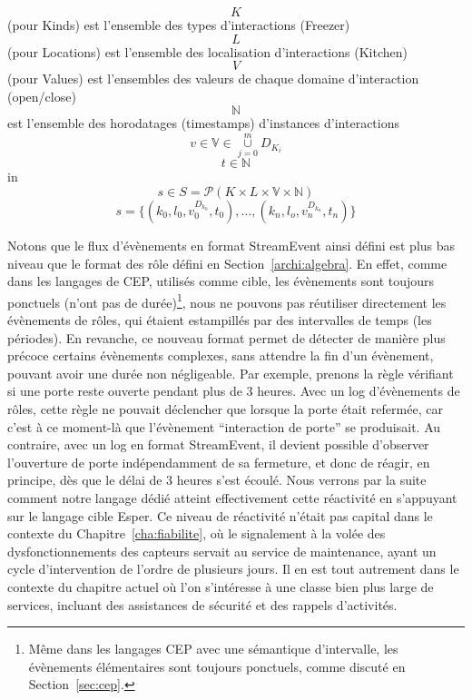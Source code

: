 \[K\] (pour Kinds) est l'ensemble des types d'interactions (\eg Freezer)
\[L\] (pour Locations) est l'ensemble des localisation d'interactions (\eg Kitchen)
\[V\] (pour Values) est l'ensembles des valeurs de chaque domaine d'interaction (\eg open/close)
\[\mathds{N}\] est l'ensemble des horodatages (timestamps) d'instances d'interactions
\[
  v \in \mathds{V} \in \overset{m}{\underset{j=0}\cup}D_{K_i}
\] 
\[ 
t \in \mathds{N}
\]
in
\[
  s \in S=\mathcal{P}(K\times L\times \mathds{V}\times \mathds{N})
\]
\[
  s =\{(k_0,l_0,v^{D_{k_0}}_0,t_0), \dots, (k_n,l_o,v^{D_{k_n}}_n,t_n)\}
\]

Notons que le flux d'évènements en format StreamEvent ainsi défini est plus bas niveau que
le format des rôle défini en Section~\ref{archi:algebra}. En effet, comme dans les langages de CEP, utilisés comme cible,
les évènements sont toujours ponctuels (\ie n'ont pas de durée)\footnote{Même
dans les langages CEP avec une sémantique d'intervalle, les évènements élémentaires
sont toujours ponctuels, comme discuté en Section~\ref{sec:cep}.}, nous ne pouvons pas réutiliser
directement les évènements de rôles, qui étaient estampillés par des intervalles de temps (les périodes).
En revanche, ce nouveau format permet de détecter de manière plus précoce certains évènements
complexes, sans attendre la fin d'un évènement, pouvant avoir une durée non négligeable. Par exemple,
prenons la règle vérifiant si une porte reste ouverte pendant plus de 3 heures. Avec un log
d'évènements de rôles, cette règle ne pouvait déclencher que lorsque la porte était refermée,
car c'est à ce moment-là que l'évènement ``interaction de porte'' se produisait. Au contraire,
avec un log en format StreamEvent, il devient possible d'observer l'ouverture de porte indépendamment
de sa fermeture, et donc de réagir, en principe, dès que le délai de 3 heures s'est écoulé. Nous
verrons par la suite comment notre langage dédié atteint effectivement cette réactivité en
s'appuyant sur le langage cible Esper. Ce niveau de réactivité n'était pas capital dans le contexte
du Chapitre~\ref{cha:fiabilite}, où le signalement à la volée des dysfonctionnements des capteurs 
servait au service de maintenance, ayant un cycle d'intervention de l'ordre de plusieurs jours. Il en
est tout autrement dans le contexte du chapitre actuel où l'on s'intéresse à une classe bien plus large de services,
incluant des assistances de sécurité et des rappels d'activités.
